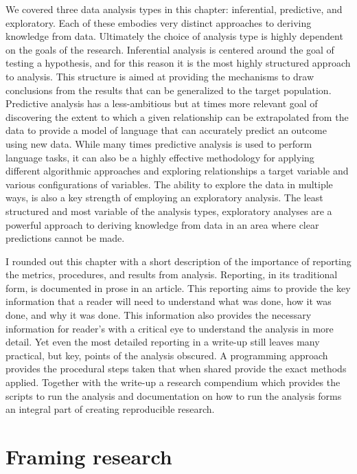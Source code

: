 \documentclass[
  letterpaper,
]{latex/krantz}
\begin{document}
We covered three data analysis types in this chapter: inferential,
predictive, and exploratory. Each of these embodies very distinct
approaches to deriving knowledge from data. Ultimately the choice of
analysis type is highly dependent on the goals of the research.
Inferential analysis is centered around the goal of testing a
hypothesis, and for this reason it is the most highly structured
approach to analysis. This structure is aimed at providing the
mechanisms to draw conclusions from the results that can be generalized
to the target population. Predictive analysis has a less-ambitious but
at times more relevant goal of discovering the extent to which a given
relationship can be extrapolated from the data to provide a model of
language that can accurately predict an outcome using new data. While
many times predictive analysis is used to perform language tasks, it can
also be a highly effective methodology for applying different
algorithmic approaches and exploring relationships a target variable and
various configurations of variables. The ability to explore the data in
multiple ways, is also a key strength of employing an exploratory
analysis. The least structured and most variable of the analysis types,
exploratory analyses are a powerful approach to deriving knowledge from
data in an area where clear predictions cannot be made.

I rounded out this chapter with a short description of the importance of
reporting the metrics, procedures, and results from analysis. Reporting,
in its traditional form, is documented in prose in an article. This
reporting aims to provide the key information that a reader will need to
understand what was done, how it was done, and why it was done. This
information also provides the necessary information for reader's with a
critical eye to understand the analysis in more detail. Yet even the
most detailed reporting in a write-up still leaves many practical, but
key, points of the analysis obscured. A programming approach provides
the procedural steps taken that when shared provide the exact methods
applied. Together with the write-up a research compendium which provides
the scripts to run the analysis and documentation on how to run the
analysis forms an integral part of creating reproducible research.

\hypertarget{sec-framing-research}{%
\chapter{Framing research}\label{sec-framing-research}}
\end{document}
